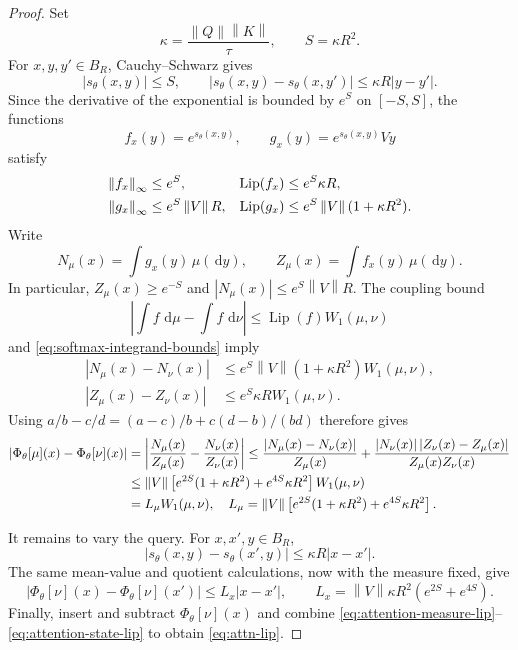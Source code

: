 \documentclass[11pt]{amsart}
\numberwithin{equation}{section}
\theoremstyle{plain}
\newcommand{\dd}{\,\mathrm{d}}
\newcommand{\abs}[1]{\left\lvert#1\right\rvert}
\newcommand{\norm}[1]{\left\lVert#1\right\rVert}
\DeclareMathOperator{\Lip}{Lip}
\begin{document}
\begin{proof}
Set
\[
 \kappa=\frac{\norm{Q}\norm{K}}{\tau},
 \qquad S=\kappa R^2.
\]
For $x,y,y'\in B_R$, Cauchy--Schwarz gives
\[
 \abs{s_\theta(x,y)}\leq S,
 \qquad
 \abs{s_\theta(x,y)-s_\theta(x,y')}
 \leq \kappa R\abs{y-y'}.
\]
Since the derivative of the exponential is bounded by $e^S$ on
$[-S,S]$, the functions
\[
 f_x(y)=e^{s_\theta(x,y)},
 \qquad g_x(y)=e^{s_\theta(x,y)}Vy
\]
satisfy
\begin{align}
 \norm{f_x}_\infty&\leq e^S,
 &\Lip(f_x)&\leq e^S\kappa R,\notag\\
 \norm{g_x}_\infty&\leq e^S\norm{V}R,
 &\Lip(g_x)&\leq e^S\norm{V}(1+\kappa R^2).
 \label{eq:softmax-integrand-bounds}
\end{align}
Write
\[
 N_\mu(x)=\int g_x(y)\,\mu(\dd y),
 \qquad Z_\mu(x)=\int f_x(y)\,\mu(\dd y).
\]
In particular, $Z_\mu(x)\geq e^{-S}$ and
$\abs{N_\mu(x)}\leq e^S\norm{V}R$.  The coupling bound
\[
 \left|\int f\,\dd\mu-\int f\,\dd\nu\right|
 \leq\Lip(f)W_1(\mu,\nu)
\]
and \eqref{eq:softmax-integrand-bounds} imply
\begin{align*}
 \abs{N_\mu(x)-N_\nu(x)}
 &\leq e^S\norm{V}(1+\kappa R^2)W_1(\mu,\nu),\\
 \abs{Z_\mu(x)-Z_\nu(x)}
 &\leq e^S\kappa R W_1(\mu,\nu).
\end{align*}
Using
$a/b-c/d=(a-c)/b+c(d-b)/(bd)$ therefore gives
\begin{align}
 \abs{\Phi_\theta[\mu](x)-\Phi_\theta[\nu](x)}
 &= \abs{\frac{N_\mu(x)}{Z_\mu(x)}-\frac{N_\nu(x)}{Z_\nu(x)}}
 \leq
 \frac{\abs{N_\mu(x)-N_\nu(x)}}{Z_\mu(x)}
 +\frac{\abs{N_\nu(x)}
          \abs{Z_\nu(x)-Z_\mu(x)}}{Z_\mu(x)Z_\nu(x)} \notag \\
 &\leq \norm{V}\left[
 e^{2S}(1+\kappa R^2)+e^{4S}\kappa R^2\right]
 W_1(\mu,\nu) \notag \\
 & = L_\mu W_1(\mu,\nu), \quad L_\mu=\norm{V}\left[
 e^{2S}(1+\kappa R^2)+e^{4S}\kappa R^2\right].  \label{eq:attention-measure-lip}
\end{align}


It remains to vary the query.  For $x,x',y\in B_R$,
\[
 \abs{s_\theta(x,y)-s_\theta(x',y)}
 \leq\kappa R\abs{x-x'}.
\]
The same mean-value and quotient calculations, now with the measure fixed,
give 
\begin{equation}\label{eq:attention-state-lip}
 \abs{\Phi_\theta[\nu](x)-\Phi_\theta[\nu](x')}
 \leq L_x\abs{x-x'},
 \qquad
 L_x=\norm{V}\kappa R^2(e^{2S}+e^{4S}).
\end{equation}
Finally, insert and subtract $\Phi_\theta[\nu](x)$ and combine
\eqref{eq:attention-measure-lip}--\eqref{eq:attention-state-lip} to obtain
\eqref{eq:attn-lip}.
\end{proof}
\end{document}
